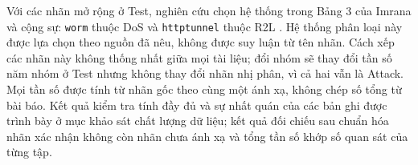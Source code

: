\documentclass[../main.tex]{subfiles}
\begin{document}
Với các nhãn mở rộng ở Test, nghiên cứu chọn hệ thống trong Bảng 3 của Imrana và cộng sự: \texttt{worm} thuộc DoS và \texttt{httptunnel} thuộc R2L \cite{task2_imrana2022}. Hệ thống phân loại này được lựa chọn theo nguồn đã nêu, không được suy luận từ tên nhãn. Cách xếp các nhãn này không thống nhất giữa mọi tài liệu; đổi nhóm sẽ thay đổi tần số năm nhóm ở Test nhưng không thay đổi nhãn nhị phân, vì cả hai vẫn là Attack. Mọi tần số được tính từ nhãn gốc theo cùng một ánh xạ, không chép số tổng từ bài báo. Kết quả kiểm tra tính đầy đủ và sự nhất quán của các bản ghi được trình bày ở mục khảo sát chất lượng dữ liệu; kết quả đối chiếu sau chuẩn hóa nhãn xác nhận không còn nhãn chưa ánh xạ và tổng tần số khớp số quan sát của từng tập.
\FloatBarrier
\end{document}
